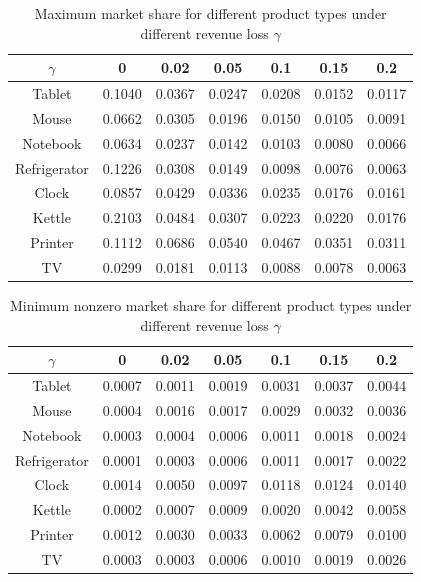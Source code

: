 \documentclass[mnsc,non-blindrev]{informs3}
\theoremstyle{definition}
\begin{document}
{\begin{table}[t]
\centering
{\scriptsize
\begin{tabular}{|c|c c c c c c|}
\hline
$\gamma$&0&0.02&0.05&0.1&0.15&0.2\\
\hline
Tablet&0.1040&0.0367&0.0247&0.0208&0.0152&0.0117\\
Mouse&0.0662&0.0305&0.0196&0.0150&0.0105&0.0091\\
Notebook&0.0634&0.0237&0.0142&0.0103&0.0080&0.0066\\
Refrigerator&0.1226&0.0308&0.0149&0.0098&0.0076&0.0063\\
Clock&0.0857&0.0429&0.0336&0.0235&0.0176&0.0161\\
Kettle&0.2103&0.0484&0.0307&0.0223&0.0220&0.0176\\
Printer&0.1112&0.0686&0.0540&0.0467&0.0351&0.0311\\
TV&0.0299&0.0181&0.0113&0.0088&0.0078&0.0063\\
\hline
\end{tabular}
}
\caption{Maximum market share for different product types under different revenue loss $\gamma$}
\label{table:real_data_2}
\end{table}

\begin{table}[t]
\centering
{\scriptsize
\begin{tabular}{|c|c c c c c c|}
\hline
$\gamma$&0&0.02&0.05&0.1&0.15&0.2\\
\hline
Tablet&0.0007&0.0011&0.0019&0.0031&0.0037&0.0044\\
Mouse&0.0004&0.0016&0.0017&0.0029&0.0032&0.0036\\
Notebook&0.0003&0.0004&0.0006&0.0011&0.0018&0.0024\\
Refrigerator&0.0001&0.0003&0.0006&0.0011&0.0017&0.0022\\
Clock&0.0014&0.0050&0.0097&0.0118&0.0124&0.0140\\
Kettle&0.0002&0.0007&0.0009&0.0020&0.0042&0.0058\\
Printer&0.0012&0.0030&0.0033&0.0062&0.0079&0.0100\\
TV&0.0003&0.0003&0.0006&0.0010&0.0019&0.0026\\
\hline
\end{tabular}
}
\caption{Minimum nonzero market share for different product types under different revenue loss $\gamma$}
\label{table:real_data_3}
\end{table}

}
\end{document}
